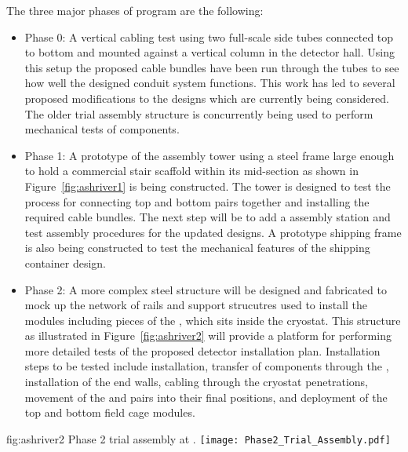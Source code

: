 The three major phases of  program are the following:
\begin{itemize}
  \item {Phase 0:} A vertical cabling test using two full-scale 
          side tubes connected top to bottom and mounted 
         against a vertical column in the detector hall.  Using this 
         setup the proposed cable bundles have been run through the 
         tubes to see how well the designed conduit system functions.
         This work has led to several proposed modifications to the 
         designs which are currently being considered.  The older 
          trial assembly structure is concurrently 
         being used to perform mechanical tests of  
         components. 
  \item {Phase 1:} A prototype of the   
         assembly tower using a steel frame large enough to hold a 
         commercial stair scaffold within its mid-section as shown 
         in Figure~\ref{fig:ashriver1} is being constructed.  The 
         tower is designed to test the process for connecting top 
         and bottom  pairs together and installing the 
         required cable bundles.  The next step will be to add a
          assembly station and test assembly procedures 
         for the updated  designs.  A prototype 
          shipping frame is also being constructed to 
         test the mechanical features of the shipping container 
         design.  
  \item {Phase 2:} A more complex steel structure will be 
         designed and fabricated to mock up the network of rails 
         and support strucutres used to install the 
          modules including pieces of the , 
         which sits inside the cryostat.  This structure as 
         illustrated in Figure~\ref{fig:ashriver2} will provide 
         a platform for performing more detailed tests of the 
         proposed detector installation plan.  Installation steps 
         to be tested include  installation, transfer 
         of  components through the , 
         installation of the  end walls, cabling 
         through the cryostat penetrations, movement of the 
          and   pairs into their final 
         positions, and deployment of the top and bottom field 
         cage modules.
\end{itemize}
\begin{dunefigure}{fig:ashriver2}
  {Phase 2 trial assembly at .}
  \texttt{[image: Phase2\_Trial\_Assembly.pdf]}
\end{dunefigure}


